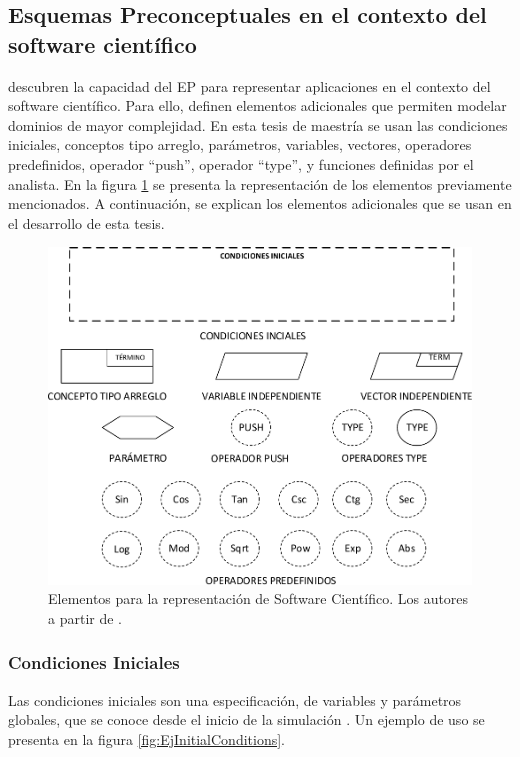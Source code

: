 \subsection{Esquemas Preconceptuales en el contexto del software científico}

\cite{JCalle, norena2018det} descubren la capacidad del EP para representar aplicaciones en el contexto del software científico. Para ello, definen elementos adicionales que permiten modelar dominios de mayor complejidad. En esta tesis de maestría se usan las condiciones iniciales, conceptos tipo arreglo, parámetros, variables, vectores, operadores predefinidos, operador ``push'', operador ``type'',  y funciones definidas por el analista. En la figura \ref{fig:NewElements} se presenta la representación de los elementos previamente mencionados. A continuación, se explican los elementos adicionales que se usan en el desarrollo de esta tesis.

\begin{figure}[h]
	\centering%
	\includegraphics[width=0.9\linewidth]{Fig/NuevosElementosDelEP.pdf}%
	\caption[Elementos para la representación de Software Científico.]{Elementos para la representación de Software Científico. Los autores a partir de \citep{JCalle,norena2018det}.} \label{fig:NewElements}
\end{figure}

\subsubsection{Condiciones Iniciales}
Las condiciones iniciales son una especificación, de variables y parámetros globales, que se conoce desde el inicio de la simulación \citep{norena2018det}. Un ejemplo de uso se presenta en la figura \ref{fig:EjInitialConditions}.

